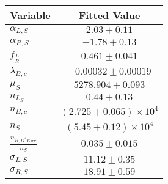 \begin{tabular}[t]{lc}
\hline
Variable &Fitted Value\\
\hline\hline
$\alpha_{L, S}$&$2.03\pm0.11$\\
\hline
$\alpha_{R, S}$&$-1.78\pm0.13$\\
\hline
$f_{\frac{L}{R}}$&$0.461\pm0.041$\\
\hline
$\lambda_{B,c}$&$-0.00032\pm0.00019$\\
\hline
$\mu_S$&$5278.904\pm0.093$\\
\hline
$n_{L_S}$&$0.44\pm0.13$\\
\hline
$n_{B,c}$&$(2.725\pm0.065)\times 10^4$\\
\hline
$n_S$&$(5.45\pm0.12)\times 10^4$\\
\hline
$\frac{n_{B,D^*K\pi\pi}}{n_S}$&$0.035\pm0.015$\\
\hline
$\sigma_{L, S}$&$11.12\pm0.35$\\
\hline
$\sigma_{R, S}$&$18.91\pm0.59$\\
\hline
\end{tabular}